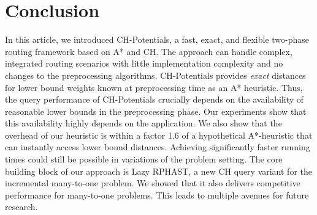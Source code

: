 \documentclass[manuscript]{acmart}
\begin{document}


\section{Conclusion}
\label{sec:conclusion}

In this article, we introduced CH-Potentials, a fast, exact, and flexible two-phase routing framework based on A* and CH.
The approach can handle complex, integrated routing scenarios with little implementation complexity and no changes to the preprocessing algorithms.
CH-Potentials provides \emph{exact} distances for lower bound weights known at preprocessing time as an A* heuristic.
Thus, the query performance of CH-Potentials crucially depends on the availability of reasonable lower bounds in the preprocessing phase.
Our experiments show that this availability highly depends on the application.
We also show that the overhead of our heuristic is within a factor 1.6 of a hypothetical A*-heuristic that can instantly access lower bound distances.
Achieving significantly faster running times could still be possible in variations of the problem setting.
The core building block of our approach is Lazy RPHAST, a new CH query variant for the incremental many-to-one problem.
We showed that it also delivers competitive performance for many-to-one problems.
This leads to multiple avenues for future research.
\end{document}
